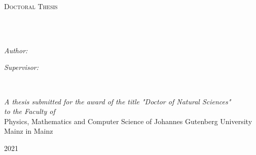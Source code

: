 \documentclass[
11pt, %
ngerman,
english, %
singlespacing, %
headsepline, %
]{MastersDoctoralThesis} %
\author{Gang \textsc{Huang}} %
\begin{document}
\frontmatter %

\pagestyle{plain} %


\begin{titlepage}
\begin{center}

\vspace*{.06\textheight}
{\scshape\LARGE \univname\par}\vspace{1.5cm} %
\textsc{\Large Doctoral Thesis}\\[0.5cm] %

\HRule \\[0.4cm] %
{\huge \bfseries \ttitle\par}\vspace{0.4cm} %
\HRule \\[1.5cm] %
 
\begin{minipage}[t]{0.4\textwidth}
\begin{flushleft} \large
\emph{Author:}\\
\href{http://www.johnsmith.com}{\authorname} %
\end{flushleft}
\end{minipage}
\begin{minipage}[t]{0.4\textwidth}
\begin{flushright} \large
\emph{Supervisor:} \\
\href{https://www.staff.uni-mainz.de/sulpizi}{\supname} %
\end{flushright}
\end{minipage}\\[3cm]
 
\vfill

	\large \textit{A thesis submitted for the award of the title "Doctor of Natural Sciences"} \\[0.3cm] %
\textit{to the Faculty of}\\[0.4cm]
Physics, Mathematics and Computer Science of Johannes Gutenberg University Mainz in Mainz
 
\vfill

{\large 2021}\\[4cm] %
 
\vfill
\end{center}
\end{titlepage}
\end{document}
